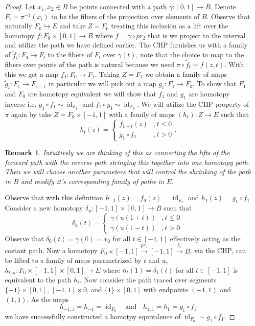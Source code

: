\documentclass[40pt]{article}
\DeclareMathOperator{\id}{\text{id}}
\newtheorem{remark}[theorem]{Remark}
\begin{document}
	\begin{proof}
		Let $x_1,x_2 \in B$ be points connected with a path $\gamma : [0,1] \rightarrow B$. Denote $F_i = \pi^{-1}(x_i)$ to be the fibers of the projection over elements of $B$. Observe that naturally $F_0 \hookrightarrow E$ and take $Z = F_0$ treating this inclusion as a lift over the homotopy $f: F_0 \times [0,1] \rightarrow B$ where $f = \gamma \circ pr_2$ that is we project to the interval and utilize the path we have defined earlier. The CHP furnishes us with a family of $\tilde f_t : F_0 \rightarrow F_t$ to the fibers of $F_t$ over $\gamma(t)$, note that the choice to map to the fibers over points of the path is natural because we need $\pi \circ \tilde f_t = f(z,t)$. With this we get a map $f_1 : F_0 \rightarrow F_1$. Taking $Z = F_1$ we obtain a family of maps $\tilde g_t : F_1 \rightarrow F_{1-t}$ in particular we will pick out a map $g_1 : F_1 \rightarrow F_0$. To show that $F_1$ and $F_0$ are homotopy equivalent we will show that $f_1$ and $g_1$ are homotopy inverse i.e. $g_1 \circ f_1 \sim \id_{F_1}$ and $f_1 \circ g_1 \sim \id_{F_0}$. We will utilize the CHP property of $\pi$ again by take $Z = F_0 \times [-1,1]$ with a family of maps $(h_t) : Z \rightarrow E$ such that 
		\[h_t(z) = \begin{cases}
			f_{1+t}(z) &, t \leq 0 \\
			g_1 \circ f_1 &,t > 0
		\end{cases}.\]
		\begin{remark}
			Intuitively we are thinking of this as connecting the lifts of the forward path with the reverse path stringing this together into one homotopy path. Then we will choose another parameters that will control the shrinking of the path in $B$ and modify it's corresponding family of paths in $E$.
		\end{remark}
		Observe that with this definition $h_{-1}(z) = f_0(z) = \id_{F_0}$ and $h_1(z) =g_1 \circ f_1 $
		Consider a new homotopy $\delta_u : [-1,1] \times [0,1] \rightarrow B$ such that 
		\[
		\delta_u(t) =\begin{cases}
			\gamma(u(1+t)) &, t\leq 0 \\
			\gamma(u(1-t)) &, t > 0
		\end{cases}.
		\]
		Observe that $\delta_0(t) = \gamma(0) = x_0$ for all $t \in [-1,1]$ effectively acting as the costant path. Now a homotopy $F_0 \times [-1,1] \xrightarrow{pr_2} [-1,1] \xrightarrow{\delta_u} B$, via the CHP, can be lifted to a family of maps parametrized by $t$ and $u$, $h_{t,u} : F_0 \times [-1,1] \times [0,1] \rightarrow E$ where $h_{t}(1) = \delta_1(t)$ for all $t \in [-1,1]$ is equivalent to the path $h_t$. Now consider the path traced over segments $\{-1\} \times [0,1]$, $[-1,1] \times 0$, and $\{1\} \times [0,1]$ with endpoints $(-1,1)$ and $(1,1)$. As the maps
		\[h_{-1,1} = h_{-1} = \id_{F_0} \quad\text{and}\quad h_{1,1} = h_1 = g_1 \circ f_1\]
		we have successfully constructed a homotpy equivalence of $\id_{F_0} \sim g_1 \circ f_1$. 
		\end{proof}
\end{document}
